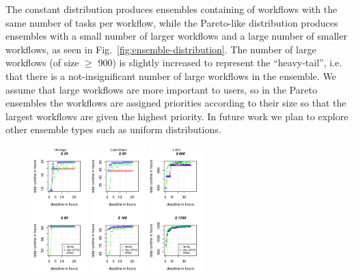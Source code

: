 \documentclass{sig-alternate}
\begin{document}
The constant distribution produces ensembles containing of workflows with the same number of tasks per workflow, 
while the Pareto-like distribution produces ensembles with a small number of larger 
workflows and a large number of smaller workflows, as seen in 
Fig.~\ref{fig:ensemble-distribution}. The number of large workflows (of size $\geq$ 900) 
is slightly increased to represent the ``heavy-tail'', i.e. that there is a 
not-insignificant number of large workflows in the ensemble. We assume that large
workflows are more important to users, so in the Pareto ensembles the workflows are 
assigned priorities according to their size so that the largest workflows are given 
the highest priority. In
future work we plan to explore other ensemble types such as uniform distributions.

\begin{figure}[t]  
\centering
\includegraphics[width=0.19\textwidth]{figures/pareto-size-MONTAGE-n-1000-8-dagh1-20m0.pdf}
\includegraphics[width=0.19\textwidth]{figures/pareto-size-CYBERSHAKE-n-1000-8-dagh1-20m0.pdf}
\includegraphics[width=0.19\textwidth]{figures/pareto-size-LIGO-n-1000-8-dagh1-40m0.pdf}

\end{figure}
\end{document}
